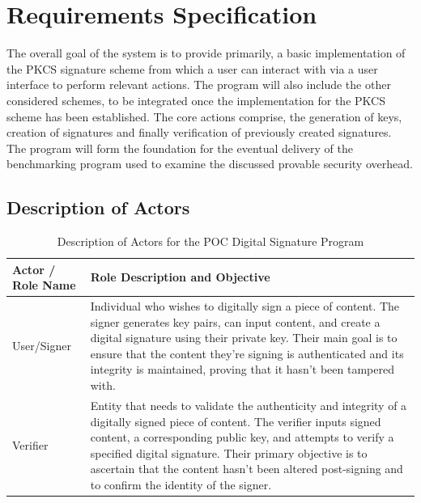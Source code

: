 \documentclass[]{final_report}
\theoremstyle{definition}
\begin{document}
\section{Requirements Specification}
The overall goal of the system is to provide primarily, a basic implementation of the PKCS signature scheme from which a user can interact with via a user interface to perform relevant actions. The program will also include the other considered schemes, to be integrated once the implementation for the PKCS scheme has been established.
The core actions comprise, the generation of keys, creation of signatures and finally verification of previously created signatures. 
The program will form the foundation for the eventual delivery of the benchmarking program used to examine the discussed provable security overhead.

\subsection{Description of Actors}
\begin{table}[H]
    \centering
    \caption{Description of Actors for the POC Digital Signature Program}
    \label{tab:actors_description}
    \begin{tabular}{|l|p{10cm}|}
    \hline
    \textbf{Actor / Role Name} & \textbf{Role Description and Objective} \\
    \hline
    User/Signer & Individual who wishes to digitally sign a piece of content. The signer generates key pairs, can input content, and create a digital signature using their private key. Their main goal is to ensure that the content they're signing is authenticated and its integrity is maintained, proving that it hasn't been tampered with. \\
    \hline
    Verifier & Entity that needs to validate the authenticity and integrity of a digitally signed piece of content. The verifier inputs signed content, a corresponding public key, and attempts to verify a specified digital signature. Their primary objective is to ascertain that the content hasn't been altered post-signing and to confirm the identity of the signer. \\
    \hline
    \end{tabular}
\end{table}
\end{document}

